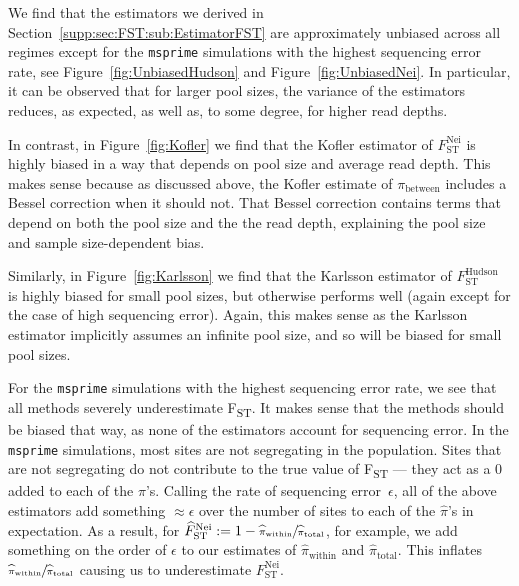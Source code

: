 \documentclass[a4paper,fontsize=9pt,DIV=14]{scrartcl}
\newcommand\figref[1]{Figure~\ref{#1}}
\newcommand{\fst}{F\textsubscript{ST}}
\newcommand{\neifst}{F_\text{ST}^\text{Nei}}
\newcommand{\hudsonfst}{F_\text{ST}^\text{Hudson}}
\newcommand{\neiestimator}{\widehat{F}_\text{ST}^\text{Nei}}
\begin{document}
We find that the estimators we derived in Section~\ref{supp:sec:FST:sub:EstimatorFST} are approximately unbiased across all regimes except for the \texttt{msprime} simulations with the highest sequencing error rate, see \figref{fig:UnbiasedHudson} and \figref{fig:UnbiasedNei}. In particular, it can be observed that for larger pool sizes, the variance of the estimators reduces, as expected, as well as, to some degree, for higher read depths.

In contrast, in \figref{fig:Kofler} we find that the Kofler estimator of $\neifst$ is highly biased in a way that depends on pool size and average read depth.  This makes sense because as discussed above, the Kofler estimate of $\pi_\text{between}$ includes a Bessel correction when it should not.  That Bessel correction contains terms that depend on both the pool size and the the read depth, explaining the pool size and sample size-dependent bias.

Similarly, in \figref{fig:Karlsson} we find that the Karlsson estimator of $\hudsonfst$ is highly biased for small pool sizes, but otherwise performs well (again except for the case of high sequencing error).  Again, this makes sense as the Karlsson estimator implicitly assumes an infinite pool size, and so will be biased for small pool sizes.

For the \texttt{msprime} simulations with the highest sequencing error rate, we see that all methods severely underestimate \fst.  It makes sense that the methods should be biased that way, as none of the estimators account for sequencing error. In the \texttt{msprime} simulations, most sites are not segregating in the population.  Sites that are not segregating do not contribute to the true value of \fst{} --- they act as a $0$ added to each of the $\pi$'s. Calling the rate of sequencing error~$\epsilon$, all of the above estimators add something $\approx \epsilon$ over the number of sites to each of the $\widehat{\pi}$'s in expectation.  As a result, for $\neiestimator := 1 - \sfrac{\widehat{\pi}_\text{within}}{\widehat{\pi}_\text{total}}$, for example, we add something on the order of $\epsilon$ to our estimates of $\widehat{\pi}_\text{within}$ and $\widehat{\pi}_\text{total}$.  This inflates $\sfrac{\widehat{\pi}_\text{within}}{\widehat{\pi}_\text{total}}$ causing us to underestimate $\neifst$.  
\end{document}
